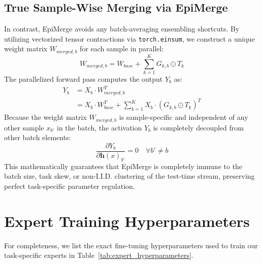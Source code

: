 \documentclass{article}
\theoremstyle{plain}
\theoremstyle{definition}
\theoremstyle{remark}
\begin{document}
\subsection{True Sample-Wise Merging via EpiMerge}
In contrast, EpiMerge avoids any batch-averaging ensembling shortcuts. By utilizing vectorized tensor contractions via \texttt{torch.einsum}, we construct a unique weight matrix $W_{merged, b}$ for each sample in parallel:
\begin{equation}
    W_{merged, b} = W_{base} + \sum_{k=1}^K G_{k, b} \odot T_k
\end{equation}
The parallelized forward pass computes the output $Y_b$ as:
\begin{align}
    Y_b &= X_b \cdot W_{merged, b}^T \nonumber\\
        &= X_b \cdot W_{base}^T + \sum_{k=1}^K X_b \cdot \left( G_{k, b} \odot T_k \right)^T
\end{align}
Because the weight matrix $W_{merged, b}$ is sample-specific and independent of any other sample $x_{b'}$ in the batch, the activation $Y_b$ is completely decoupled from other batch elements:
\begin{equation}
    \frac{\partial Y_b}{\partial \mathbf{h}(x)_{b'}} = 0 \quad \forall b' \neq b
\end{equation}
This mathematically guarantees that EpiMerge is completely immune to the batch size, task skew, or non-I.I.D. clustering of the test-time stream, preserving perfect task-specific parameter regulation.

\section{Expert Training Hyperparameters}
\label{app:expert_hyperparameters}

For completeness, we list the exact fine-tuning hyperparameters used to train our task-specific experts in Table~\ref{tab:expert_hyperparameters}.
\end{document}
